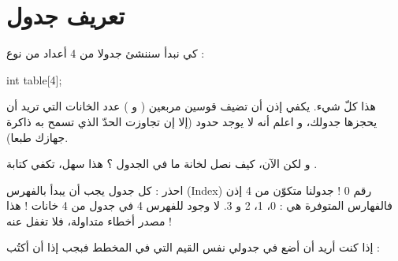 \section{تعريف جدول}
كي نبدأ سننشئ جدولا من 4 أعداد من نوع
 :
\begin{Csource}
int table[4];
\end{Csource}
هذا كلّ شيء. يكفي إذن أن تضيف قوسين مربعين
(\InlineCode{[}
و
\InlineCode{]})
عدد الخانات التي تريد أن يحجزها جدولك، و اعلم أنه لا يوجد حدود (إلا إن تجاوزت الحدّ الذي تسمح به ذاكرة جهازك طبعا).

و لكن الآن، كيف نصل لخانة ما في الجدول ؟
هذا سهل، تكفي كتابة
.
\begin{critical}
 احذر : كل جدول يجب أن يبدأ بالفهرس
(\textenglish{Index})
رقم 0 ! جدولنا متكوّن من 4
إذن فالفهارس المتوفرة هي : 0، 1، 2 و 3. لا وجود للفهرس 4 في جدول من 4 خانات ! هذا مصدر أخطاء متداولة، فلا تغفل عنه !

\end{critical}

إذا كنت أريد أن أضع في جدولي نفس القيم التي في المخطط فبجب إذا أن أكتُب :


